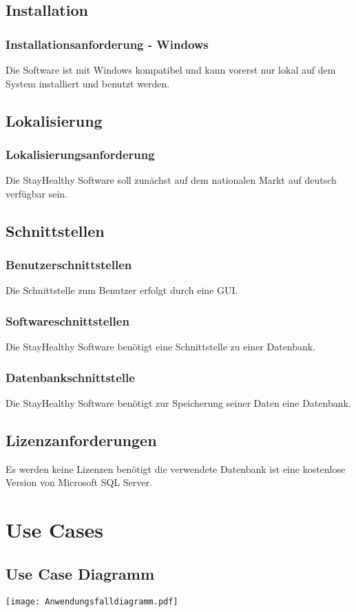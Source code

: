 \documentclass[12pt,a4paper,onecolumn]{article}
\begin{document}
\subsection{Installation}
\subsubsection{Installationsanforderung - Windows}
Die Software ist mit Windows kompatibel und kann vorerst nur lokal auf dem System installiert und benutzt werden.
\subsection{Lokalisierung}
\subsubsection{Lokalisierungsanforderung}
Die StayHealthy Software soll zunächst auf dem nationalen Markt auf deutsch verfügbar sein.
\subsection{Schnittstellen}
\subsubsection{Benutzerschnittstellen}
Die Schnittstelle zum Benutzer erfolgt durch eine GUI.
\subsubsection{Softwareschnittstellen}
Die StayHealthy Software benötigt eine Schnittstelle zu einer Datenbank.
\subsubsection{Datenbankschnittstelle}
Die StayHealthy Software benötigt zur Speicherung seiner Daten eine Datenbank.
\subsection{Lizenzanforderungen}
Es werden keine Lizenzen benötigt die verwendete Datenbank ist eine kostenlose Version von Microsoft SQL Server.

\section{Use Cases}
\subsection{Use Case Diagramm}
\texttt{[image: Anwendungsfalldiagramm.pdf]}
\end{document}
